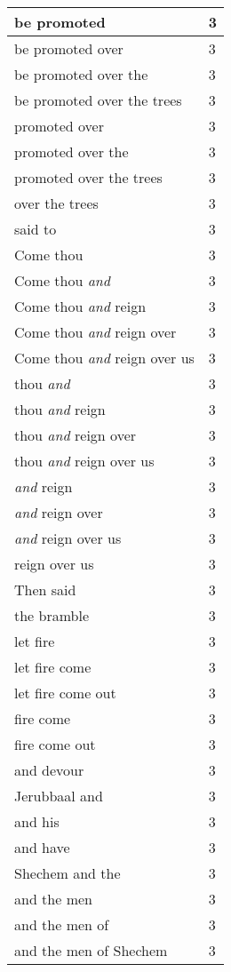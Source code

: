 \begin{center}
\begin{longtable}{|p{3.0in}|p{0.5in}|}
be promoted & 3\\ \hline 
be promoted over & 3\\ \hline 
be promoted over the & 3\\ \hline 
be promoted over the trees & 3\\ \hline 
promoted over & 3\\ \hline 
promoted over the & 3\\ \hline 
promoted over the trees & 3\\ \hline 
over the trees & 3\\ \hline 
said to & 3\\ \hline 
Come thou & 3\\ \hline 
Come thou \emph{and} & 3\\ \hline 
Come thou \emph{and} reign & 3\\ \hline 
Come thou \emph{and} reign over & 3\\ \hline 
Come thou \emph{and} reign over us & 3\\ \hline 
thou \emph{and} & 3\\ \hline 
thou \emph{and} reign & 3\\ \hline 
thou \emph{and} reign over & 3\\ \hline 
thou \emph{and} reign over us & 3\\ \hline 
\emph{and} reign & 3\\ \hline 
\emph{and} reign over & 3\\ \hline 
\emph{and} reign over us & 3\\ \hline 
reign over us & 3\\ \hline 
Then said & 3\\ \hline 
the bramble & 3\\ \hline 
let fire & 3\\ \hline 
let fire come & 3\\ \hline 
let fire come out & 3\\ \hline 
fire come & 3\\ \hline 
fire come out & 3\\ \hline 
and devour & 3\\ \hline 
Jerubbaal and & 3\\ \hline 
and his & 3\\ \hline 
and have & 3\\ \hline 
Shechem and the & 3\\ \hline 
and the men & 3\\ \hline 
and the men of & 3\\ \hline 
and the men of Shechem & 3\\ \hline 

\end{longtable}
\end{center}
